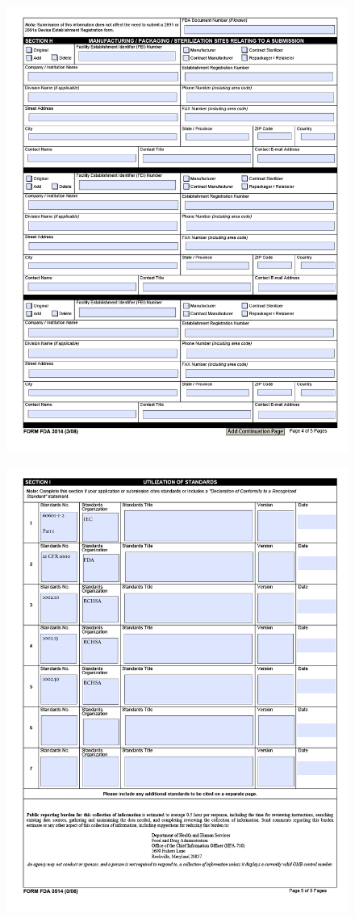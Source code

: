 \begin{figure}[H]
  \centering
  \includegraphics[width=1.2\linewidth]{pages/cdrh-pics/4}
  \label{fig:summary}
\end{figure}

\begin{figure}[H]
  \centering
  \includegraphics[width=1.2\linewidth]{pages/cdrh-pics/5}
  \label{fig:summary}
\end{figure}

